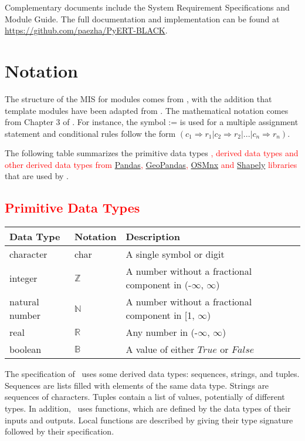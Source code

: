 \documentclass[12pt, titlepage]{article}
\begin{document}
Complementary documents include the System Requirement Specifications
and Module Guide.  The full documentation and implementation can be
found at \url{https://github.com/paezha/PyERT-BLACK}.


\section{Notation}


The structure of the MIS for modules comes from \citet{HoffmanAndStrooper1995},
with the addition that template modules have been adapted from
\cite{GhezziEtAl2003}.  The mathematical notation comes from Chapter 3 of
\citet{HoffmanAndStrooper1995}.  For instance, the symbol := is used for a
multiple assignment statement and conditional rules follow the form $(c_1
\Rightarrow r_1 | c_2 \Rightarrow r_2 | ... | c_n \Rightarrow r_n )$.

The following table summarizes the primitive data types \textcolor{red}{, derived data types and other derived data types from \href{https://pandas.pydata.org/docs/}{Pandas}, \href{https://geopandas.org/en/stable/docs.html}{GeoPandas}, \href{https://osmnx.readthedocs.io/en/stable/osmnx.html }{OSMnx} and \href{https://shapely.readthedocs.io/en/stable/manual.html}{Shapely} libraries} that are used by \progname. 

\subsection{\textcolor{red}{Primitive Data Types}}
\begin{center}
\renewcommand{\arraystretch}{1.2}
\noindent 
\begin{tabular}{l l p{7.5cm}} 
\toprule 
\textbf{Data Type} & \textbf{Notation} & \textbf{Description}\\ 
\midrule
character & char & A single symbol or digit\\
integer & $\mathbb{Z}$ & A number without a fractional component in (-$\infty$, $\infty$) \\
natural number & $\mathbb{N}$ & A number without a fractional component in [1, $\infty$) \\
real & $\mathbb{R}$ & Any number in (-$\infty$, $\infty$)\\
boolean & $\mathbb{B}$ & A value of either $True$ or $False$\\
\bottomrule
\end{tabular} 
\end{center}
\noindent
The specification of \progname \ uses some derived data types: sequences, strings, and
tuples. Sequences are lists filled with elements of the same data type. Strings
are sequences of characters. Tuples contain a list of values, potentially of
different types. In addition, \progname \ uses functions, which
are defined by the data types of their inputs and outputs. Local functions are
described by giving their type signature followed by their specification.
\end{document}
